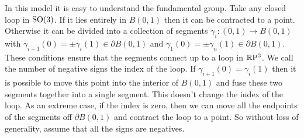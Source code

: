 In this model it is easy to understand the fundamental group.
Take any closed loop in $\mathrm{SO}(3)$.
If it lies entirely in $B(0,1)$ then it can be contracted to a point.
Otherwise it can be divided into a collection of segments $\gamma_i : (0,1) \to B(0,1)$ with $\gamma_{i+1}(0) = \pm \gamma_i(1) \in \partial B(0,1)$ and $\gamma_1(0) = \pm \gamma_n(1) \in \partial B(0,1)$.
These conditions ensure that the segments connect up to a loop in $\mathbb{R}\mathrm{P}^3$.
We call the number of negative signs the index of the loop.
If $\gamma_{i+1}(0) = \gamma_i(1)$ then it is possible to move this point into the interior of $B(0,1)$ and fuse these two segments together into a single segment.
This doesn't change the index of the loop.
As an extreme case, if the index is zero, then we can move all the endpoints of the segments off $\partial B(0,1)$ and contract the loop to a point.
So without loss of generality, assume that all the signs are negatives.
\begin{center}
\end{center}
